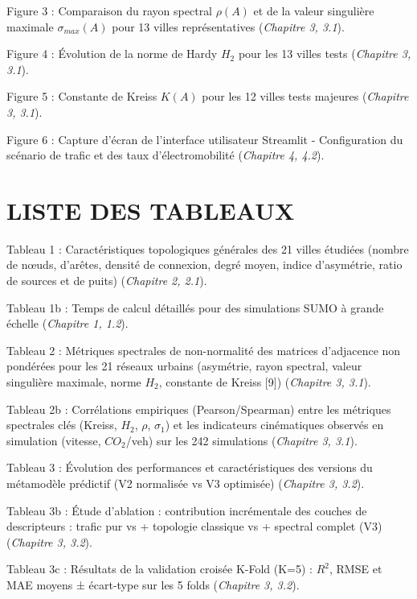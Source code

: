 \documentclass[10pt, a4paper]{article}
\begin{document}
Figure 3 : Comparaison du rayon spectral \(\rho(A)\) et de la valeur
singulière maximale \(\sigma_{max}(A)\) pour 13 villes représentatives
(\emph{Chapitre 3, 3.1}).

Figure 4 : Évolution de la norme de Hardy \(H_2\) pour les 13 villes
tests (\emph{Chapitre 3, 3.1}).

Figure 5 : Constante de Kreiss \(K(A)\) pour les 12 villes tests
majeures (\emph{Chapitre 3, 3.1}).

Figure 6 : Capture d'écran de l'interface utilisateur Streamlit -
Configuration du scénario de trafic et des taux d'électromobilité
(\emph{Chapitre 4, 4.2}).

\endgroup

\newpage

\section{LISTE DES TABLEAUX}\label{liste-des-tableaux}

\begingroup
\setlength{\parskip}{0.8em}

Tableau 1 : Caractéristiques topologiques générales des 21 villes
étudiées (nombre de nœuds, d'arêtes, densité de connexion, degré moyen,
indice d'asymétrie, ratio de sources et de puits) (\emph{Chapitre 2,
2.1}).

Tableau 1b : Temps de calcul détaillés pour des simulations SUMO à
grande échelle (\emph{Chapitre 1, 1.2}).

Tableau 2 : Métriques spectrales de non-normalité des matrices
d'adjacence non pondérées pour les 21 réseaux urbains (asymétrie, rayon
spectral, valeur singulière maximale, norme \(H_2\), constante de Kreiss
{[}9{]}) (\emph{Chapitre 3, 3.1}).

Tableau 2b : Corrélations empiriques (Pearson/Spearman) entre les
métriques spectrales clés (Kreiss, \(H_2\), \(\rho\), \(\sigma_1\)) et
les indicateurs cinématiques observés en simulation (vitesse,
\(CO_2\)/veh) sur les 242 simulations (\emph{Chapitre 3, 3.1}).

Tableau 3 : Évolution des performances et caractéristiques des versions
du métamodèle prédictif (V2 normalisée vs V3 optimisée) (\emph{Chapitre
3, 3.2}).

Tableau 3b : Étude d'ablation : contribution incrémentale des couches de
descripteurs : trafic pur vs + topologie classique vs + spectral complet
(V3) (\emph{Chapitre 3, 3.2}).

Tableau 3c : Résultats de la validation croisée K-Fold (K=5) : \(R^2\),
RMSE et MAE moyens ± écart-type sur les 5 folds (\emph{Chapitre 3,
3.2}).
\end{document}
